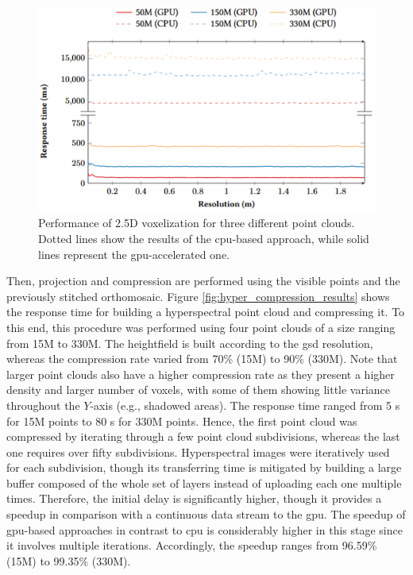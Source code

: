 \begin{figure}[bt]
    \centering
    \includegraphics[width=\linewidth]{figs/hyper_point_cloud/voxelization_results.png}
	\caption{Performance of 2.5D voxelization for three different point clouds. Dotted lines show the results of the \acrshort{cpu}-based approach, while solid lines represent the \acrshort{gpu}-accelerated one. }
	\label{fig:hyper_voxelization_results}
\end{figure}

Then, projection and compression are performed using the visible points and the previously stitched orthomosaic. Figure \ref{fig:hyper_compression_results} shows the response time for building a hyperspectral point cloud and compressing it. To this end, this procedure was performed using four point clouds of a size ranging from 15M to 330M. The heightfield is built according to the \acrshort{gsd} resolution, whereas the compression rate varied from 70\% (15M) to 90\% (330M). Note that larger point clouds also have a higher compression rate as they present a higher density and larger number of voxels, with some of them showing little variance throughout the $Y$-axis (e.g., shadowed areas). The response time ranged from 5 \si{\second} for 15M points to 80 \si{\second} for 330M points. Hence, the first point cloud was compressed by iterating through a few point cloud subdivisions, whereas the last one requires over fifty subdivisions. Hyperspectral images were iteratively used for each subdivision, though its transferring time is mitigated by building a large buffer composed of the whole set of layers instead of uploading each one multiple times. Therefore, the initial delay is significantly higher, though it provides a speedup in comparison with a continuous data stream to the \acrshort{gpu}. The speedup of \acrshort{gpu}-based approaches in contrast to \acrshort{cpu} is considerably higher in this stage since it involves multiple iterations. Accordingly, the speedup ranges from 96.59\% (15M) to 99.35\% (330M).


